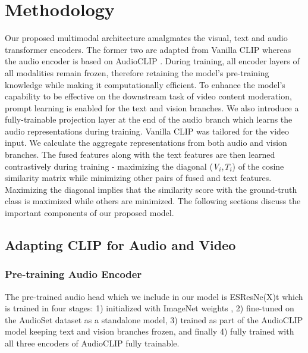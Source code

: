 \documentclass[letterpaper]{article}
\begin{document}
\section{Methodology}\label{M}
Our proposed multimodal architecture amalgmates the visual, text and audio transformer encoders. The former two are adapted from Vanilla CLIP \cite{vanilla_clip} whereas the audio encoder is based on AudioCLIP \cite{audio_clip}. During training, all encoder layers of all modalities remain frozen, therefore retaining the model's pre-training knowledge while making it computationally efficient. To enhance the model's capability to be effective on the downstream task of video content moderation, prompt learning is enabled for the text and vision branches. We also introduce a fully-trainable projection layer at the end of the audio branch which learns the audio representations during training. Vanilla CLIP was tailored for the video input. We calculate the aggregate representations from both audio and vision branches.  The fused features along with the text features are then learned contrastively during training - maximizing the diagonal  (\textit{V$_{i}$},\textit{T$_{i}$}) of the cosine similarity matrix while minimizing other pairs of fused and text features. Maximizing the diagonal implies that the similarity score with the ground-truth class is maximized while others are minimized. The following sections discuss the important components of our proposed model.


\subsection{Adapting CLIP for Audio and Video}

\subsubsection{Pre-training Audio Encoder}
The pre-trained audio head which we include in our model is ESResNe(X)t \cite{esresnext} which is trained in four stages: 1) initialized with ImageNet weights \cite{image_net}, 2) fine-tuned on the AudioSet dataset \cite{audio_set} as a standalone model, 3) trained as part of the AudioCLIP model \cite{audio_clip} keeping text and vision branches frozen, and finally 4) fully trained with all three encoders of AudioCLIP fully trainable. 
\end{document}
